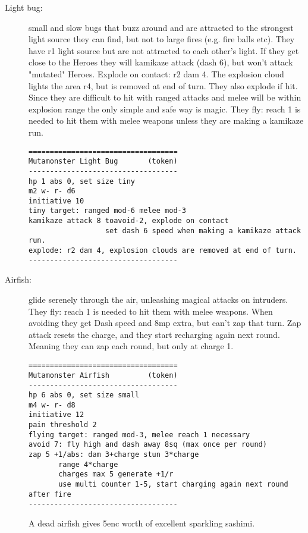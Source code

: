 \begin{description}

\item[Light bug:] small and slow bugs that buzz around and are attracted to the strongest light source they can find, but not to large fires (e.g. fire balls etc). They have r1 light source but are not attracted to each other's light. If they get close to the Heroes they will kamikaze attack (dash 6), but won't attack "mutated" Heroes. Explode on contact: r2 dam 4. The explosion cloud lights the area r4, but is removed at end of turn.
They also explode if hit. Since they are difficult to hit with ranged attacks and melee will be within explosion range the only simple and safe way is magic.
They fly: reach 1 is needed to hit them with melee weapons unless they are making a kamikaze run.
\goodbreak \begin{samepage} \small \begin{verbatim}
===================================
Mutamonster Light Bug       (token)
-----------------------------------
hp 1 abs 0, set size tiny
m2 w- r- d6
initiative 10
tiny target: ranged mod-6 melee mod-3
kamikaze attack 8 toavoid-2, explode on contact
                  set dash 6 speed when making a kamikaze attack run.
explode: r2 dam 4, explosion clouds are removed at end of turn.
-----------------------------------
\end{verbatim} \normalsize \end{samepage}


\item[Airfish:] glide serenely through the air, unleashing magical attacks on intruders. They fly: reach 1 is needed to hit them with melee weapons.
When avoiding they get Dash speed and 8mp extra, but can't zap that turn.
Zap attack resets the charge, and they start recharging again next round. Meaning they can zap each round, but only at charge 1.
\goodbreak \begin{samepage} \small \begin{verbatim}
===================================
Mutamonster Airfish         (token)
-----------------------------------
hp 6 abs 0, set size small
m4 w- r- d8
initiative 12
pain threshold 2
flying target: ranged mod-3, melee reach 1 necessary
avoid 7: fly high and dash away 8sq (max once per round)
zap 5 +1/abs: dam 3+charge stun 3*charge
       range 4*charge
       charges max 5 generate +1/r
       use multi counter 1-5, start charging again next round after fire
-----------------------------------
\end{verbatim} \normalsize \end{samepage}
A dead airfish gives 5enc worth of excellent sparkling sashimi.



\end{description}
